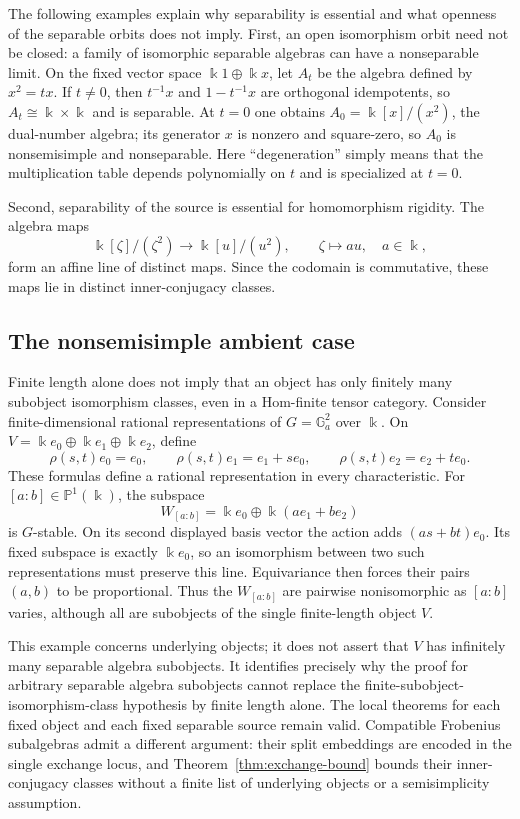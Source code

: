 \documentclass[11pt]{amsart}
\theoremstyle{definition}
\theoremstyle{remark}
\newcommand{\kk}{\Bbbk}
\begin{document}
The following examples explain why separability is essential and what
openness of the separable orbits does not imply.  First, an open
isomorphism orbit need not be closed: a family of isomorphic separable
algebras can have a nonseparable limit.  On the fixed vector
space $\kk 1\oplus\kk x$, let $A_t$ be the algebra defined by
$x^2=t x$.  If $t\ne0$, then $t^{-1}x$ and $1-t^{-1}x$ are orthogonal
idempotents, so $A_t\cong\kk\times\kk$ and is separable.  At $t=0$ one
obtains $A_0=\kk[x]/(x^2)$, the dual-number algebra; its generator $x$ is
nonzero and square-zero, so $A_0$ is nonsemisimple and nonseparable.  Here
``degeneration'' simply means that the multiplication table depends
polynomially on $t$ and is specialized at $t=0$.

Second, separability of the source is essential for homomorphism
rigidity.  The algebra maps
\[
  \kk[\zeta]/(\zeta^2)
  \longrightarrow
  \kk[u]/(u^2),
  \qquad
  \zeta\longmapsto a u,
  \quad a\in\kk,
\]
form an affine line of distinct maps.  Since the codomain is commutative,
these maps lie in distinct inner-conjugacy classes.


\subsection{The nonsemisimple ambient case}

Finite length alone does not imply that an object has only finitely many
subobject isomorphism classes, even in a Hom-finite tensor category.
Consider finite-dimensional rational representations of
$G=\mathbb G_a^2$ over $\kk$.  On
$V=\kk e_0\oplus\kk e_1\oplus\kk e_2$, define
\[
 \rho(s,t)e_0=e_0,\qquad
 \rho(s,t)e_1=e_1+s e_0,\qquad
 \rho(s,t)e_2=e_2+t e_0.
\]
These formulas define a rational representation in every characteristic.
For $[a:b]\in\mathbb P^1(\kk)$, the subspace
\[
 W_{[a:b]}=\kk e_0\oplus\kk(ae_1+be_2)
\]
is $G$-stable.  On its second displayed basis vector the action adds
$(as+bt)e_0$.  Its fixed subspace is exactly $\kk e_0$, so an isomorphism
between two such representations must preserve this line.  Equivariance
then forces their pairs $(a,b)$ to be proportional.  Thus the
$W_{[a:b]}$ are pairwise nonisomorphic as $[a:b]$ varies, although all are
subobjects of the single finite-length object $V$.

This example concerns underlying objects; it does not assert that $V$ has
infinitely many separable algebra subobjects.  It identifies precisely why
the proof for arbitrary separable algebra subobjects cannot replace the
finite-subobject-isomorphism-class hypothesis by finite length alone.
The local theorems for each fixed object and each fixed separable source
remain valid.  Compatible Frobenius subalgebras admit a different argument:
their split embeddings are encoded in the single exchange locus, and
Theorem~\ref{thm:exchange-bound} bounds their inner-conjugacy classes
without a finite list of underlying objects or a semisimplicity assumption.
\end{document}
